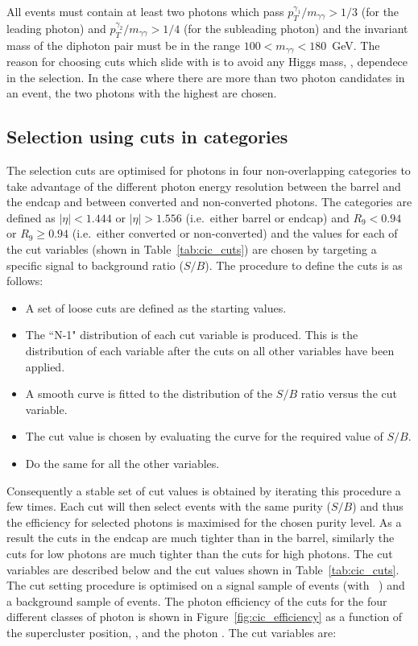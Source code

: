 All events must contain at least two photons which pass $p_{T}^{\gamma_{1}}/m_{\gamma\gamma}>1/3$ (for the leading photon) and $p_{T}^{\gamma_{2}}/m_{\gamma\gamma}>1/4$ (for the subleading photon) and the invariant mass of the diphoton pair must be in the range $100<m_{\gamma\gamma}<180$~GeV. The reason for choosing \pT cuts which slide with \mgg is to avoid any Higgs mass, \mH, dependece in the selection. In the case where there are more than two photon candidates in an event, the two photons with the highest \pT are chosen. 

\subsection{Selection using cuts in categories}
\label{sec:cic}

The selection cuts are optimised for photons in four non-overlapping categories to take advantage of the different photon energy resolution between the barrel and the endcap and between converted and non-converted photons. The categories are defined as $|\eta|<1.444$ or $|\eta|>1.556$ (i.e.\ either barrel or endcap) and $R_{9}<0.94$ or $R_{9}\geq 0.94$ (i.e.\ either converted or non-converted) and the values for each of the cut variables (shown in Table~\ref{tab:cic_cuts}) are chosen by targeting a specific signal to background ratio ($S/B$). The procedure to define the cuts is as follows:

\begin{itemize}
  \item A set of loose cuts are defined as the starting values.
  \item The ``N-1" distribution of each cut variable is produced. This is the distribution of each variable after the cuts on all other variables have been applied.
  \item A smooth curve is fitted to the distribution of the $S/B$ ratio versus the cut variable.
  \item The cut value is chosen by evaluating the curve for the required value of $S/B$.
  \item Do the same for all the other variables.
\end{itemize}

Consequently a stable set of cut values is obtained by iterating this procedure a few times. Each cut will then select events with the same purity ($S/B$) and thus the efficiency for selected photons is maximised for the chosen purity level. As a result the cuts in the endcap are much tighter than in the barrel, similarly the cuts for low \rnine photons are much tighter than the cuts for high \rnine photons. The cut variables are described below and the cut values shown in Table~\ref{tab:cic_cuts}. The cut setting procedure is optimised on a signal sample of \Hgg \MC events (with ~\GeV) and a background sample of \gjet events. The photon efficiency of the cuts for the four different classes of photon is shown in Figure~\ref{fig:cic_efficiency} as a function of the supercluster position, \eta, and the photon \pT. The cut variables are:

